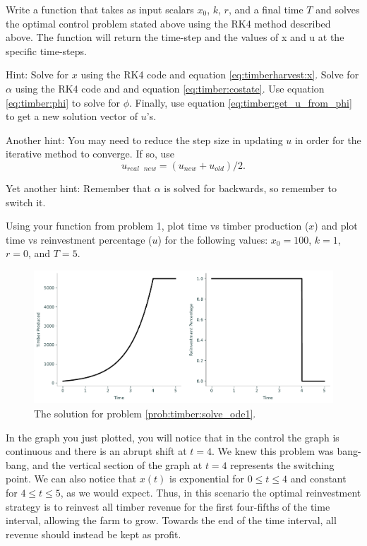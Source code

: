 \begin{problem}
Write a function that takes as input scalars $x_{0}$, $k$, $r$, and a final time $T$ and solves the optimal control problem stated above using the RK4 method described above. The function will return the time-step and the values of x and u at the specific time-steps.

Hint: Solve for $x$ using the RK4 code and equation \eqref{eq:timberharvest:x}. Solve for $\alpha$ using the RK4 code and and equation \eqref{eq:timber:costate}. Use equation \eqref{eq:timber:phi} to solve for $\phi$. Finally, use equation \eqref{eq:timber:get_u_from_phi} to get a new solution vector of $u$'s.

Another hint: You may need to reduce the step size in updating $u$ in order for the iterative method to converge. If so, use
\[u_{real\text{ }new} = (u_{new} + u_{old}) / 2.\]

Yet another hint: Remember that $\alpha$ is solved for backwards, so remember to switch it.

\end{problem}

\begin{problem}
\label{prob:timber:solve_ode1}
Using your function from problem 1, plot time vs timber production ($x$) and plot time vs reinvestment percentage ($u$) for the following values: $x_{0} = 100$, $k = 1$, $r = 0$, and $T = 5$.

\end{problem}
\begin{figure}[H]
\includegraphics[width=\textwidth]{figures/Example_problem2.pdf}
\caption{The solution for problem \ref{prob:timber:solve_ode1}.}
\end{figure}

In the graph you just plotted, you will notice that in the control the graph is continuous and there is an abrupt shift at $t = 4$.
We knew this problem was bang-bang, and the vertical section of the graph at $t = 4$ represents the switching point.
We can also notice that $x(t)$ is exponential for $0 \leq t \leq 4$ and constant for $4 \leq t \leq 5$, as we would expect.
Thus, in this scenario the optimal reinvestment strategy is to reinvest all timber revenue for the first four-fifths of the time interval, allowing the farm to grow. Towards the end of the time interval, all revenue should instead be kept as profit.

